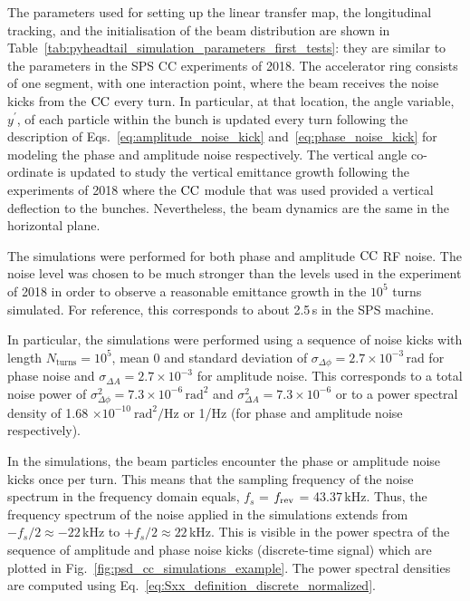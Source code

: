 The parameters used for setting up the linear transfer map, the longitudinal tracking, and the initialisation of the beam distribution are shown in Table~\ref{tab:pyheadtail_simulation_parameters_first_tests}: they are similar to the parameters in the SPS CC experiments of 2018. The accelerator ring consists of one segment, with one interaction point, where the beam receives the noise kicks from the ${\mathrm{CC}}$ every turn. In particular, at that location, the angle variable, $y^\prime$, of each particle within the bunch is updated every turn following the description of Eqs.~\eqref{eq:amplitude_noise_kick} and~\eqref{eq:phase_noise_kick} for modeling the phase and amplitude noise respectively. The vertical angle co-ordinate is updated to study the vertical emittance growth following the experiments of 2018 where the ${\mathrm{CC}}$ module that was used provided a vertical deflection to the bunches. Nevertheless, the beam dynamics are the same in the horizontal plane.

The simulations were performed for both phase and amplitude ${\mathrm{CC}}$ RF noise. The noise level was chosen to be much stronger than the levels used in the experiment of 2018 in order to observe a reasonable emittance growth in the $10^5$ turns simulated. For reference, this corresponds to about 2.5\,s in the SPS machine. 

In particular, the simulations were performed using a sequence of noise kicks with length $N_\mathrm{turns}=10^5$, mean 0 and standard deviation of $\sigma_{\Delta \phi}=2.7\times 10^{-3}$\,rad for phase noise and $\sigma_{\Delta A}=2.7\times 10^{-3}$ for amplitude noise. This corresponds to a total noise power of $\sigma_{\Delta \phi}^2 =7.3 \times 10^{-6} \, \mathrm{rad^2}$ and $\sigma_{\Delta A}^2 =7.3 \times 10^{-6}$ or to a power spectral density of 1.68 $\times 10^{-10} \ \mathrm{rad^2/Hz}$ or 1/Hz (for phase and amplitude noise respectively).


In the simulations, the beam particles encounter the phase or amplitude noise kicks once per turn. This means that the sampling frequency of the noise spectrum in the frequency domain equals, $f_s$ = ${f_\mathrm{rev}}$ = 43.37\,kHz. Thus, the frequency spectrum of the noise applied in the simulations extends from  $-f_s/2 \approx -22$\,kHz to $+f_s/2 \approx 22$\,kHz. This is visible in the power spectra of the sequence of amplitude and phase noise kicks (discrete-time signal) which are plotted in Fig.~\ref{fig:psd_cc_simulations_example}. The power spectral densities are computed using Eq.~\eqref{eq:Sxx_definition_discrete_normalized}.  

